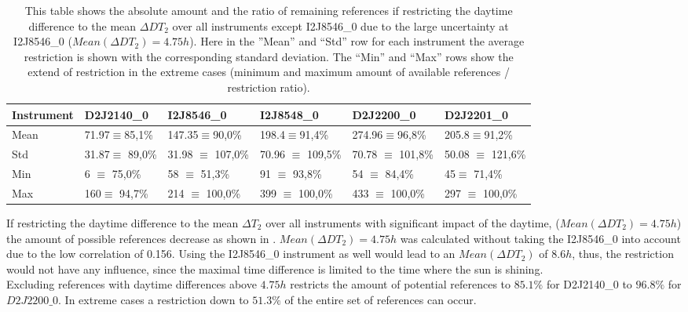 	\begin{table}
	\begin{tabular}{|p{2cm}|p{2cm}|p{2cm}|p{2cm}|p{2cm}|p{2cm}|}
		Instrument	&D2J2140\_0&I2J8546\_0& I2J8548\_0&D2J2200\_0&D2J2201\_0\\
		\toprule
		Mean&
		71.97$\equiv$85,1\% &		147.35$\equiv$90,0\%&
		198.4$\equiv$91,4\%&		274.96$\equiv$96,8\%&
		205.8$\equiv$91,2\%\\
		\midrule
		Std&		31.87$\equiv$	89,0\%&31.98 $\equiv$	107,0\%&
		70.96 $\equiv$	109,5\%&		70.78 $\equiv$	101,8\%&
		50.08 $\equiv$	121,6\% \\
		\midrule
		Min&
		6 $\equiv$	75,0\%&		58 $\equiv$	51,3\%
		&91 $\equiv$	93,8\%		&54  $\equiv$	84,4\%
		&45$\equiv$	71,4\%\\
		\midrule
		Max&
		160$\equiv$	94,7\% &
		214 $\equiv$	100,0\% &
		399 $\equiv$	100,0\% &
		433  $\equiv$	100,0\% &
		297 $\equiv$	100,0\% \\
		\bottomrule
	\end{tabular}
	\caption{This table shows the absolute amount and the ratio of remaining references if restricting the daytime difference to the mean $\Delta DT_{2}$ over all instruments except I2J8546\_0 due to the large uncertainty at I2J8546\_0 ($Mean(\Delta DT_{2}) = 4.75h$). Here in the ”Mean” and “Std” row for each  instrument the average restriction is shown with the corresponding standard deviation. The “Min” and “Max” rows show the extend of restriction in the extreme cases (minimum and maximum amount of available references / restriction ratio).}
	\label{tab:daytimerest}
\end{table}	
If restricting the daytime difference to the mean $\Delta T_{2}$ over all instruments with significant impact of the daytime, ($Mean(\Delta DT_{2}) = 4.75h$) the amount of possible references decrease as shown in . $Mean(\Delta DT_{2}) = 4.75h$ was calculated without taking the I2J8546\_0 into account due to the low correlation of 0.156. Using the I2J8546\_0 instrument as well would lead to an  $Mean(\Delta DT_{2})$ of $8.6h$, thus, the restriction would not have any influence, since the maximal time difference is limited to the time where the sun is shining.\\ 
Excluding references with daytime differences above $4.75h$ restricts the amount of potential references to $85.1\%$ for D2J2140\_0 to $96.8\%$ for $ D2J2200\_0$. In extreme cases a restriction down to $51.3\%$ of the entire set of references can occur.
	
